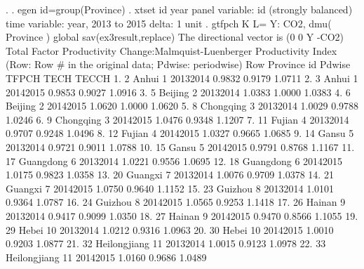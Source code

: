. 
. egen id=group(Province)
{\smallskip}
. xtset id year
panel variable:  id (strongly balanced)
time variable:  year, 2013 to 2015
delta:  1 unit
{\smallskip}
. gtfpch K L= Y: CO2, dmu( Province ) global sav(ex3result,replace)
{\smallskip}
The directional vector is (0 0 Y -CO2)
{\smallskip}
{\smallskip}
Total Factor Productivity Change:Malmquist-Luenberger Productivity Index
(Row: Row \# in the original data; Pdwise: periodwise)
{\smallskip}
{\TLC}
{\VBAR} Row         Province   id      Pdwise    TFPCH     TECH    TECCH {\VBAR}
{\LFTT}
1. {\VBAR}   2            Anhui    1   2013{\tytilde}2014   0.9832   0.9179   1.0711 {\VBAR}
2. {\VBAR}   3            Anhui    1   2014{\tytilde}2015   0.9853   0.9027   1.0916 {\VBAR}
3. {\VBAR}   5          Beijing    2   2013{\tytilde}2014   1.0383   1.0000   1.0383 {\VBAR}
4. {\VBAR}   6          Beijing    2   2014{\tytilde}2015   1.0620   1.0000   1.0620 {\VBAR}
5. {\VBAR}   8        Chongqing    3   2013{\tytilde}2014   1.0029   0.9788   1.0246 {\VBAR}
6. {\VBAR}   9        Chongqing    3   2014{\tytilde}2015   1.0476   0.9348   1.1207 {\VBAR}
7. {\VBAR}  11           Fujian    4   2013{\tytilde}2014   0.9707   0.9248   1.0496 {\VBAR}
8. {\VBAR}  12           Fujian    4   2014{\tytilde}2015   1.0327   0.9665   1.0685 {\VBAR}
9. {\VBAR}  14            Gansu    5   2013{\tytilde}2014   0.9721   0.9011   1.0788 {\VBAR}
10. {\VBAR}  15            Gansu    5   2014{\tytilde}2015   0.9791   0.8768   1.1167 {\VBAR}
11. {\VBAR}  17        Guangdong    6   2013{\tytilde}2014   1.0221   0.9556   1.0695 {\VBAR}
12. {\VBAR}  18        Guangdong    6   2014{\tytilde}2015   1.0175   0.9823   1.0358 {\VBAR}
13. {\VBAR}  20          Guangxi    7   2013{\tytilde}2014   1.0076   0.9709   1.0378 {\VBAR}
14. {\VBAR}  21          Guangxi    7   2014{\tytilde}2015   1.0750   0.9640   1.1152 {\VBAR}
15. {\VBAR}  23          Guizhou    8   2013{\tytilde}2014   1.0101   0.9364   1.0787 {\VBAR}
16. {\VBAR}  24          Guizhou    8   2014{\tytilde}2015   1.0565   0.9253   1.1418 {\VBAR}
17. {\VBAR}  26           Hainan    9   2013{\tytilde}2014   0.9417   0.9099   1.0350 {\VBAR}
18. {\VBAR}  27           Hainan    9   2014{\tytilde}2015   0.9470   0.8566   1.1055 {\VBAR}
19. {\VBAR}  29            Hebei   10   2013{\tytilde}2014   1.0212   0.9316   1.0963 {\VBAR}
20. {\VBAR}  30            Hebei   10   2014{\tytilde}2015   1.0010   0.9203   1.0877 {\VBAR}
21. {\VBAR}  32     Heilongjiang   11   2013{\tytilde}2014   1.0015   0.9123   1.0978 {\VBAR}
22. {\VBAR}  33     Heilongjiang   11   2014{\tytilde}2015   1.0160   0.9686   1.0489 {\VBAR}
